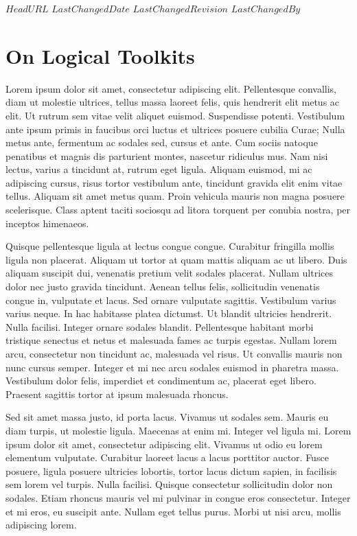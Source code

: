 \svnidlong
{$HeadURL$}
{$LastChangedDate$}
{$LastChangedRevision$}
{$LastChangedBy$}

\chapter{On Logical Toolkits}
Lorem ipsum dolor sit amet, consectetur adipiscing elit.
Pellentesque convallis, diam ut molestie ultrices, tellus massa laoreet felis, quis hendrerit elit metus ac elit.
Ut rutrum sem vitae velit aliquet euismod.
Suspendisse potenti.
Vestibulum ante ipsum primis in faucibus orci luctus et ultrices posuere cubilia Curae; Nulla metus ante, fermentum ac sodales sed, cursus et ante.
Cum sociis natoque penatibus et magnis dis parturient montes, nascetur ridiculus mus.
Nam nisi lectus, varius a tincidunt at, rutrum eget ligula.
Aliquam euismod, mi ac adipiscing cursus, risus tortor vestibulum ante, tincidunt gravida elit enim vitae tellus.
Aliquam sit amet metus quam.
Proin vehicula mauris non magna posuere scelerisque.
Class aptent taciti sociosqu ad litora torquent per conubia nostra, per inceptos himenaeos.

Quisque pellentesque ligula at lectus congue congue.
Curabitur fringilla mollis ligula non placerat.
Aliquam ut tortor at quam mattis aliquam ac ut libero.
Duis aliquam suscipit dui, venenatis pretium velit sodales placerat.
Nullam ultrices dolor nec justo gravida tincidunt.
Aenean tellus felis, sollicitudin venenatis congue in, vulputate et lacus.
Sed ornare vulputate sagittis.
Vestibulum varius varius neque.
In hac habitasse platea dictumst.
Ut blandit ultricies hendrerit.
Nulla facilisi.
Integer ornare sodales blandit.
Pellentesque habitant morbi tristique senectus et netus et malesuada fames ac turpis egestas.
Nullam lorem arcu, consectetur non tincidunt ac, malesuada vel risus.
Ut convallis mauris non nunc cursus semper.
Integer et mi nec arcu sodales euismod in pharetra massa.
Vestibulum dolor felis, imperdiet et condimentum ac, placerat eget libero.
Praesent sagittis tortor at ipsum malesuada rhoncus.

Sed sit amet massa justo, id porta lacus.
Vivamus ut sodales sem.
Mauris eu diam turpis, ut molestie ligula.
Maecenas at enim mi.
Integer vel ligula mi.
Lorem ipsum dolor sit amet, consectetur adipiscing elit.
Vivamus ut odio eu lorem elementum vulputate.
Curabitur laoreet lacus a lacus porttitor auctor.
Fusce posuere, ligula posuere ultricies lobortis, tortor lacus dictum sapien, in facilisis sem lorem vel turpis.
Nulla facilisi.
Quisque consectetur sollicitudin dolor non sodales.
Etiam rhoncus mauris vel mi pulvinar in congue eros consectetur.
Integer et mi eros, eu suscipit ante.
Nullam eget tellus purus.
Morbi ut nisi arcu, mollis adipiscing lorem.

